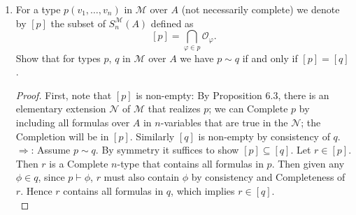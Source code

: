 \documentclass{article}
\begin{document}
\begin{enumerate}[label={\bf Q\arabic*:}]
\begin{proof}
      Let $X\subseteq S^{\mathcal{M}}_n(A)$ be both open and closed. Since
      $X$ is open, $X=\cup_{i\in I}\mathcal{O}_{\varphi_i}$ for some set of
      formulas $\{\varphi_i\}_{i\in I}$. Similarly, since
      $S^{\mathcal{M}}_n(A)\setminus X$ is open, it is equals to
      $\cup_{j\in J}\mathcal{O}_{\phi_j}$ for some set of formulas
      $\{\phi_j\}_{j\in J}$. Then $\cup_{i\in
      I}\mathcal{O}_{\varphi_i}\cup\cup_{j\in J}\mathcal{O}_{\phi_j}$ is an
      open cover of $S^{\mathcal{M}}_n(A)$, so by compactness of
      $S^{\mathcal{M}}_n(A)$ as stated in Claim 6.12,
      $S^{\mathcal{M}}_n(A)$ is covered by some finite
      $\mathcal{O}_{\varphi_1},\ldots,\mathcal{O}_{\varphi_m}$ and
      $\mathcal{O}_{\phi_1},\ldots,\mathcal{O}_{\phi_n}$. Then
      $X=\cup_{i=1}^{m}\mathcal{O}_{\varphi_i}$, so it suffices to show
      that $\cup_{i=1}^{m}\mathcal{O}_{\varphi_i}=\mathcal{O}_{\varphi}$,
      where $\varphi$ is the disjunction of $\varphi_1,\ldots,\varphi_m$.
      $\subseteq$ holds because any type $p\in S^{\mathcal{M}}_n(A)$ that
      contains $\varphi_i$ must also contain $\varphi$ from Completeness
      and consistency of $p$. Similarly, $\supseteq$ holds because any type
      $p\in S^{\mathcal{M}}_n(A)$ that contains $\varphi$ must also
      contain $\varphi_i$ for some $i\in\{1,\ldots,m\}$ from Completeness
      and consistency of $p$. 
    \end{proof}

  \item For a type $p(v_1,\ldots,v_n)$ in $\mathcal{M}$ over $A$ (not
    necessarily complete) we denote by $[p]$ the subset of
    $S^{\mathcal{M}}_n(A)$ defined as \[[p]=\bigcap_{\varphi\in
    p}\mathcal{O}_{\varphi}.\] Show that for types $p$, $q$ in
    $\mathcal{M}$ over $A$ we have $p\sim q$ if and only if $[p]=[q]$.

    \begin{proof}
      First, note that $[p]$ is non-empty: By Proposition 6.3, there is an
      elementary extension $\mathcal{N}$ of $\mathcal{M}$ that realizes
      $p$; we can Complete $p$ by including all formulas over $A$ in
      $n$-variables that are true in the $\mathcal{N}$; the Completion will
      be in $[p]$. Similarly $[q]$ is non-empty by consistency of $q$. \\

      $\Rightarrow$: Assume $p\sim q$. By symmetry it suffices to show
      $[p]\subseteq[q]$. Let $r\in[p]$. Then $r$ is a Complete $n$-type
      that contains all formulas in $p$. Then given any $\phi\in q$, since
      $p\vdash\phi$, $r$ must also contain $\phi$ by consistency and
      Completeness of $r$. Hence $r$ contains all formulas in $q$, which
      implies $r\in[q]$. \\


\end{proof}
\end{enumerate}
\end{document}
